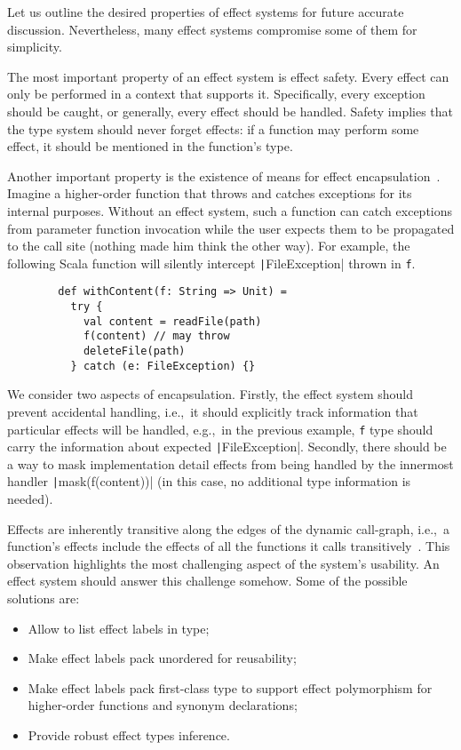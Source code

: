 \documentclass[conference]{IEEEtran}
\begin{document}
    Let us outline the desired properties of effect systems for future accurate discussion.
    Nevertheless, many effect systems compromise some of them for simplicity.

    The most important property of an effect system is effect safety.
    Every effect can only be performed in a context that supports it.
    Specifically, every exception should be caught, or generally, every effect should be handled.
    Safety implies that the type system should never forget effects: if a function may perform some effect, it should be mentioned in the function's type.

    Another important property is the existence of means for effect encapsulation~\cite{lindley2018encapsulating}.
    Imagine a higher-order function that throws and catches exceptions for its internal purposes.
    Without an effect system, such a function can catch exceptions from parameter function invocation while the user expects them to be propagated to the call site (nothing made him think the other way).
    For example, the following Scala function will silently intercept \texttt|FileException| thrown in \texttt{f}.
    \begin{verbatim}
        def withContent(f: String => Unit) =
          try {
            val content = readFile(path)
            f(content) // may throw
            deleteFile(path)
          } catch (e: FileException) {}
    \end{verbatim}

    We consider two aspects of encapsulation.
    Firstly, the effect system should prevent accidental handling, i.e.,\ it should explicitly track information that particular effects will be handled, e.g.,\ in the previous example, \texttt{f} type should carry the information about expected \texttt|FileException|.
    Secondly, there should be a way to mask implementation detail effects from being handled by the innermost handler \texttt|mask(f(content))| (in this case, no additional type information is needed).

    Effects are inherently transitive along the edges of the dynamic call-graph, i.e.,\ a function's effects include the effects of all the functions it calls transitively~\cite{odersky2022scoped}.
    This observation highlights the most challenging aspect of the system's usability.
    An effect system should answer this challenge somehow.
    Some of the possible solutions are:
    \begin{itemize}
        \item Allow to list effect labels in type;
        \item Make effect labels pack unordered for reusability;
        \item Make effect labels pack first-class type to support effect polymorphism for higher-order functions and synonym declarations;
        \item Provide robust effect types inference.
    \end{itemize}
\end{document}
